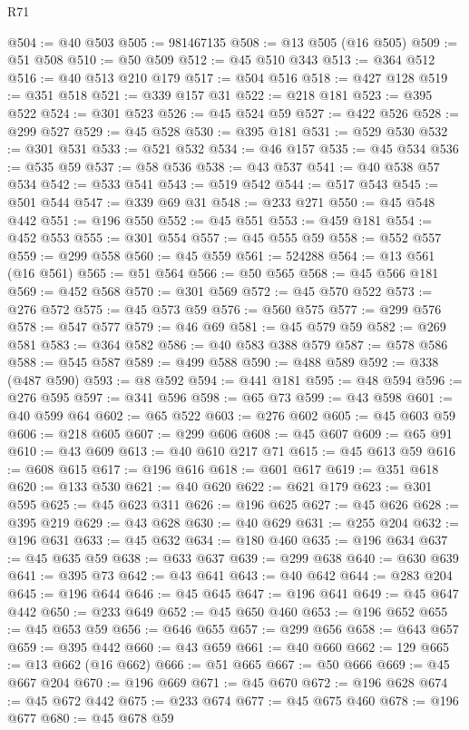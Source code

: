 \begin{lexlean}{R71}
\begin{coremodule}
@504 := @40 @503
@505 := 981467135
@508 := @13 @505 (@16 @505)
@509 := @51 @508
@510 := @50 @509
@512 := @45 @510 @343
@513 := @364 @512
@516 := @40 @513 @210 @179
@517 := @504 @516
@518 := @427 @128
@519 := @351 @518
@521 := @339 @157 @31
@522 := @218 @181
@523 := @395 @522
@524 := @301 @523
@526 := @45 @524 @59
@527 := @422 @526
@528 := @299 @527
@529 := @45 @528
@530 := @395 @181
@531 := @529 @530
@532 := @301 @531
@533 := @521 @532
@534 := @46 @157
@535 := @45 @534
@536 := @535 @59
@537 := @58 @536
@538 := @43 @537
@541 := @40 @538 @57 @534
@542 := @533 @541
@543 := @519 @542
@544 := @517 @543
@545 := @501 @544
@547 := @339 @69 @31
@548 := @233 @271
@550 := @45 @548 @442
@551 := @196 @550
@552 := @45 @551
@553 := @459 @181
@554 := @452 @553
@555 := @301 @554
@557 := @45 @555 @59
@558 := @552 @557
@559 := @299 @558
@560 := @45 @559
@561 := 524288
@564 := @13 @561 (@16 @561)
@565 := @51 @564
@566 := @50 @565
@568 := @45 @566 @181
@569 := @452 @568
@570 := @301 @569
@572 := @45 @570 @522
@573 := @276 @572
@575 := @45 @573 @59
@576 := @560 @575
@577 := @299 @576
@578 := @547 @577
@579 := @46 @69
@581 := @45 @579 @59
@582 := @269 @581
@583 := @364 @582
@586 := @40 @583 @388 @579
@587 := @578 @586
@588 := @545 @587
@589 := @499 @588
@590 := @488 @589
@592 := @338 (@487 @590)
@593 := @8 @592
@594 := @441 @181
@595 := @48 @594
@596 := @276 @595
@597 := @341 @596
@598 := @65 @73
@599 := @43 @598
@601 := @40 @599 @64
@602 := @65 @522
@603 := @276 @602
@605 := @45 @603 @59
@606 := @218 @605
@607 := @299 @606
@608 := @45 @607
@609 := @65 @91
@610 := @43 @609
@613 := @40 @610 @217 @71
@615 := @45 @613 @59
@616 := @608 @615
@617 := @196 @616
@618 := @601 @617
@619 := @351 @618
@620 := @133 @530
@621 := @40 @620
@622 := @621 @179
@623 := @301 @595
@625 := @45 @623 @311
@626 := @196 @625
@627 := @45 @626
@628 := @395 @219
@629 := @43 @628
@630 := @40 @629
@631 := @255 @204
@632 := @196 @631
@633 := @45 @632
@634 := @180 @460
@635 := @196 @634
@637 := @45 @635 @59
@638 := @633 @637
@639 := @299 @638
@640 := @630 @639
@641 := @395 @73
@642 := @43 @641
@643 := @40 @642
@644 := @283 @204
@645 := @196 @644
@646 := @45 @645
@647 := @196 @641
@649 := @45 @647 @442
@650 := @233 @649
@652 := @45 @650 @460
@653 := @196 @652
@655 := @45 @653 @59
@656 := @646 @655
@657 := @299 @656
@658 := @643 @657
@659 := @395 @442
@660 := @43 @659
@661 := @40 @660
@662 := 129
@665 := @13 @662 (@16 @662)
@666 := @51 @665
@667 := @50 @666
@669 := @45 @667 @204
@670 := @196 @669
@671 := @45 @670
@672 := @196 @628
@674 := @45 @672 @442
@675 := @233 @674
@677 := @45 @675 @460
@678 := @196 @677
@680 := @45 @678 @59

\end{coremodule}
\end{lexlean}
